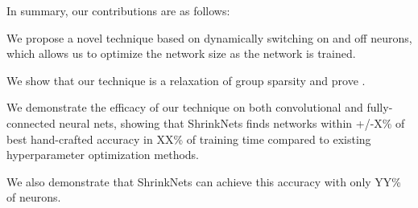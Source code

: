 
In summary, our contributions are as follows: 
\begin{compactenum}
\item We propose a novel technique based on dynamically switching on and off neurons, 
which allows us to optimize the network size as the network is trained. 
\item We show that our technique is a relaxation of group sparsity and 
prove . 
\item {}
\item We demonstrate the efficacy of our technique on both convolutional and fully-connected neural nets,
showing that 
ShrinkNets finds networks within +/-X\% of best hand-crafted accuracy in XX\% of
training time compared to existing hyperparameter optimization methods.
\item We also demonstrate that ShrinkNets can achieve this accuracy with only YY\% 
of neurons.
\item {}
\item {}
\item {}
\end{compactenum}
